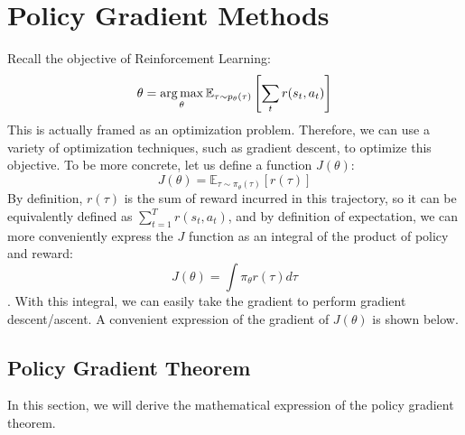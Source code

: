\chapter{Policy Gradient Methods}
Recall the objective of Reinforcement Learning:
$$\theta = \operatorname*{arg\,max}_\theta\mathbb{E}_{\tau\sim p_\theta(\tau)}\left[\sum_t r(s_t,a_t)\right]$$
This is actually framed as an optimization problem. Therefore, we can use a variety of optimization techniques, such as gradient descent, to optimize this objective. To be more concrete, let us define a function $J(\theta)$:
$$J(\theta) = \mathbb{E}_{\tau\sim \pi_\theta(\tau)}[r(\tau)]$$
By definition, $r(\tau)$ is the sum of reward incurred in this trajectory, so it can be equivalently defined as $\sum_{t=1}^T r(s_t,a_t)$, and by definition of expectation, we can more conveniently express the $J$ function as an integral of the product of policy and reward:
$$J(\theta) = \int \pi_\theta r(\tau)d\tau$$.
With this integral, we can easily take the gradient to perform gradient descent/ascent. A convenient expression of the gradient of $J(\theta)$ is shown below.
\section{Policy Gradient Theorem}
In this section, we will derive the mathematical expression of the policy gradient theorem.

